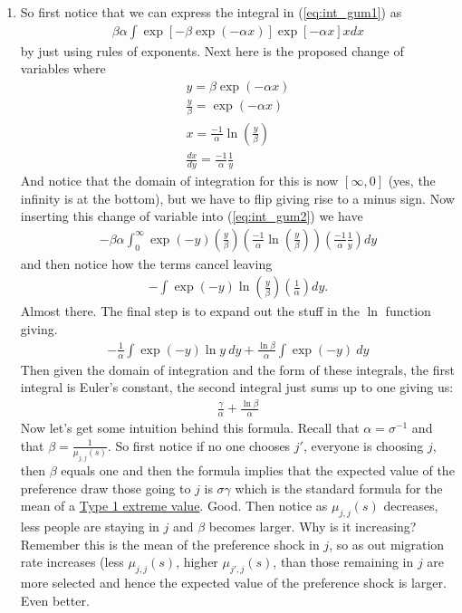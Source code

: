 \documentclass[pdftex,11pt]{article}
\begin{document}
\begin{enumerate}
\item So first notice that we can express the integral in (\ref{eq:int_gum1}) as
\begin{align}
\beta \alpha \int \exp[-\beta\exp(-\alpha x)]\exp[-\alpha x]x dx
\label{eq:int_gum2}
\end{align}
by just using rules of exponents. Next here is the proposed change of variables where
\begin{align}
y = \beta \exp(-\alpha x)\\
\frac{y}{\beta} = \exp(-\alpha x) \\
x = \frac{-1}{\alpha}\ln \left(\frac{y}{\beta}\right)\\
\frac{dx}{dy} = \frac{-1}{\alpha}\frac{1}{y}
\label{eq:change_var}
\end{align}
And notice that the domain of integration for this is now $[\infty, 0]$ (yes, the infinity is at the bottom), but we have to flip giving rise to a minus sign. Now inserting this change of variable into (\ref{eq:int_gum2}) we have
\begin{align}
-\beta \alpha \int_{0}^{\infty} \exp(-y)\left(\frac{y}{\beta}\right)\left(\frac{-1}{\alpha}\ln \left(\frac{y}{\beta}\right)\right)\left(\frac{-1}{\alpha}\frac{1}{y}\right)dy
\end{align}
and then notice how the terms cancel leaving
\begin{align}
-\int \exp(-y)\ln \left(\frac{y}{\beta}\right)\left(\frac{1}{\alpha}\right)dy.
\end{align}
Almost there. The final step is to expand out the stuff in the $\ln$ function giving.
\begin{align}
-\frac{1}{\alpha} \int \exp(-y)\ln y \ dy  +  \frac{\ln \beta}{\alpha} \int \exp(-y) \ dy
\end{align}
Then given the domain of integration and the form of these integrals, the first integral is Euler's constant, the second integral just sums up to one giving us:
\begin{align}
\frac{\gamma}{\alpha} + \frac{\ln \beta}{\alpha}
\end{align}
Now let's get some intuition behind this formula. Recall that $\alpha = \sigma^{-1}$ and that $\beta = \frac{1}{\mu_{j,j}(s)}$. So first notice if no one chooses $j'$, everyone is choosing $j$, then $\beta$ equals one and then the formula implies that the expected value of the preference draw those going to $j$ is $\sigma \gamma$ which is the standard formula for the mean of a \href{https://en.wikipedia.org/wiki/Gumbel_distribution}{Type 1 extreme value}. Good. Then notice as $\mu_{j,j}(s)$ decreases, less people are staying in $j$ and $\beta$ becomes larger. Why is it increasing? Remember this is the mean of the preference shock in $j$, so as out migration rate increases (less $\mu_{j,j}(s)$, higher $\mu_{j',j}(s)$, than those remaining in $j$ are more selected and hence the expected value of the preference shock is larger. Even better.


\end{enumerate}
\end{document}
